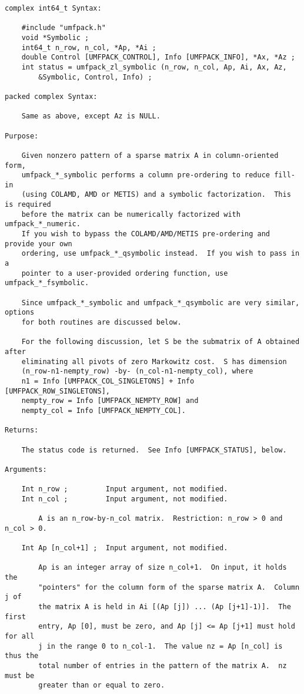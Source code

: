 \documentclass[11pt]{article}
\begin{document}
{\begin{verbatim}
complex int64_t Syntax:

    #include "umfpack.h"
    void *Symbolic ;
    int64_t n_row, n_col, *Ap, *Ai ;
    double Control [UMFPACK_CONTROL], Info [UMFPACK_INFO], *Ax, *Az ;
    int status = umfpack_zl_symbolic (n_row, n_col, Ap, Ai, Ax, Az,
        &Symbolic, Control, Info) ;

packed complex Syntax:

    Same as above, except Az is NULL.

Purpose:

    Given nonzero pattern of a sparse matrix A in column-oriented form,
    umfpack_*_symbolic performs a column pre-ordering to reduce fill-in
    (using COLAMD, AMD or METIS) and a symbolic factorization.  This is required
    before the matrix can be numerically factorized with umfpack_*_numeric.
    If you wish to bypass the COLAMD/AMD/METIS pre-ordering and provide your own
    ordering, use umfpack_*_qsymbolic instead.  If you wish to pass in a
    pointer to a user-provided ordering function, use umfpack_*_fsymbolic.

    Since umfpack_*_symbolic and umfpack_*_qsymbolic are very similar, options
    for both routines are discussed below.

    For the following discussion, let S be the submatrix of A obtained after
    eliminating all pivots of zero Markowitz cost.  S has dimension
    (n_row-n1-nempty_row) -by- (n_col-n1-nempty_col), where
    n1 = Info [UMFPACK_COL_SINGLETONS] + Info [UMFPACK_ROW_SINGLETONS],
    nempty_row = Info [UMFPACK_NEMPTY_ROW] and
    nempty_col = Info [UMFPACK_NEMPTY_COL].

Returns:

    The status code is returned.  See Info [UMFPACK_STATUS], below.

Arguments:

    Int n_row ;         Input argument, not modified.
    Int n_col ;         Input argument, not modified.

        A is an n_row-by-n_col matrix.  Restriction: n_row > 0 and n_col > 0.

    Int Ap [n_col+1] ;  Input argument, not modified.

        Ap is an integer array of size n_col+1.  On input, it holds the
        "pointers" for the column form of the sparse matrix A.  Column j of
        the matrix A is held in Ai [(Ap [j]) ... (Ap [j+1]-1)].  The first
        entry, Ap [0], must be zero, and Ap [j] <= Ap [j+1] must hold for all
        j in the range 0 to n_col-1.  The value nz = Ap [n_col] is thus the
        total number of entries in the pattern of the matrix A.  nz must be
        greater than or equal to zero.


\end{verbatim}}
\end{document}

